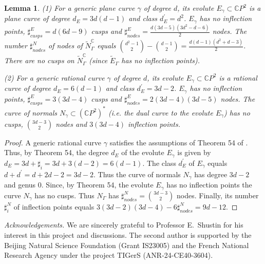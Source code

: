 \documentclass[reqno]{amsart}
\newtheorem{lemma}[theorem]{Lemma}
\newcommand{\bC}{\mathbb{C}}
\newcommand {\ga}{\gamma}
\newcommand {\Ga}{\Gamma}
\theoremstyle{definition}
\theoremstyle{remark}
\theoremstyle{definition}
\theoremstyle{definition}
\theoremstyle{definition}
\begin{document}
  \begin{lemma} {\rm (1)}  For a generic plane curve $\ga$ of degree $d$,  its evolute $E_\ga\subset \bC P^2$  is a plane curve of degree $d_E=3d(d-1)$ and class $d^\prime_E=d^2$. $E_\ga$ has no inflection points,
  $\sharp_{cusps}^E= d(6d-9)$ cusps and $\sharp^E_{nodes}=\frac{d (3d-5)(3d^2-d-6)}{2}$ nodes.   The number $\sharp_{nodes}^N$ of nodes of $\tilde N_\Ga^\bC$  equals $\binom{d^2-1}{2} - \binom{d-1}{2}=\frac{d(d-1) (d^2+d-3)}{2}$.  There are no  cusps on $\tilde N_\Ga^\bC$   (since $\tilde E_\Ga$ has no inflection points).

 \noindent
  {\rm (2)}
  For a generic rational curve $\ga$ of degree $d$, its evolute $E_\ga\subset \bC P^2$  is a rational curve of degree $d_E=6(d-1)$ and class $d^\prime_E=3d-2$. $E_\ga$ has no inflection points,  $\sharp_{cusps}^E=3(3d-4)$ cusps and $\sharp^E_{nodes}=2(3d-4)(3d-5)$ nodes. The  curve of normals $N_\ga\subset (\bC P^2)^\ast$ (i.e. the dual curve to the evolute $E_\ga$)  has no cusps, $\binom {3d-3}{2}$ nodes and $3(3d-4)$ inflection points.

\end{lemma}

\begin{proof} A generic rational curve $\ga$ satisfies the assumptions of Theorem 54 of  \cite{Coo}. Thus, by Theorem 54,  the degree $d_E$ of the evolute $E_\ga$ is given by $d_E=3d+\sharp_i=3d+3(d-2)=6(d-1)$.  The class $d^\prime_E$ of $E_\ga$ equals $d+d^\prime=d+2d-2=3d-2$.   Thus the curve of normals $N_\ga$ has degree $3d-2$ and genus $0$. Since, by Theorem 54, the evolute $E_\ga$ has no inflection points the curve $N_\ga$ has no cusps. Thus $N_\Ga$ has $\sharp^N_{nodes}=\binom {3d-3}{2}$ nodes. Finally, its number $\sharp^N_{i}$ of inflection points equals $3(3d-2)(3d-4)-6 \sharp^N_{nodes}=9d-12$.
\end{proof}

\smallskip
\noindent
\emph{Acknowledgements.} We are sincerely grateful to Professor E.~Shustin for his interest in this project and discussions. The second author is supported by the Beijing Natural Science Foundation (Grant IS23005) and the French National Research Agency under the project TIGerS (ANR-24-CE40-3604).
\end{document}
